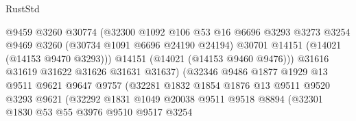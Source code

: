 \begin{lexlean}{RustStd}
\begin{coremodule}
                                    @9459
                                    @3260
                                    @30774
                                    (@32300
                                      @1092
                                      @106
                                      @53
                                      @16
                                      @6696
                                      @3293
                                      @3273
                                      @3254
                                      @9469
                                      @3260
                                      (@30734 @1091 @6696 @24190 @24194)
                                      @30701
                                      @14151
                                      (@14021 (@14153 @9470 @3293)))
                                    @14151
                                    (@14021 (@14153 @9460 @9476)))
                                  @31616
                                  @31619
                                  @31622
                                  @31626
                                  @31631
                                  @31637)
                                (@32346
                                  @9486
                                  @1877
                                  @1929
                                  @13
                                  @9511
                                  @9621
                                  @9647
                                  @9757
                                  (@32281
                                    @1832
                                    @1854
                                    @1876
                                    @13
                                    @9511
                                    @9520
                                    @3293
                                    @9621
                                    (@32292
                                      @1831
                                      @1049
                                      @20038
                                      @9511
                                      @9518
                                      @8894
                                      (@32301
                                        @1830
                                        @53
                                        @55
                                        @3976
                                        @9510
                                        @9517
                                        @3254

\end{coremodule}
\end{lexlean}
